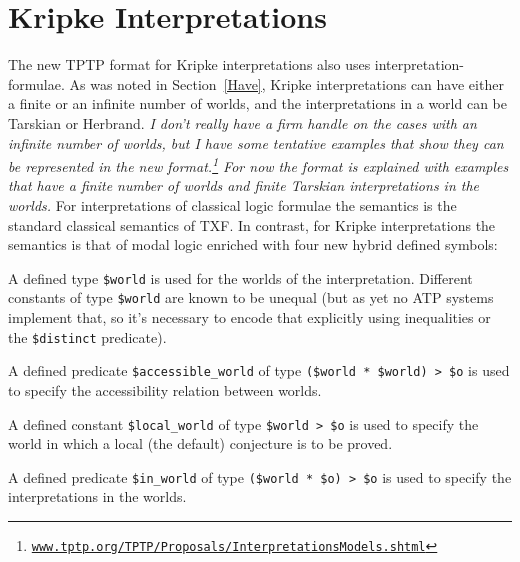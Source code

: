 \documentclass{easychair}
\newenvironment{packed_itemize}{
\vspace*{-0.3em}
\begin{itemize}
\setlength{\partopsep}{0pt}
\setlength{\itemsep}{1pt}
\setlength{\parskip}{0pt}
\setlength{\parsep}{0pt}
}{\end{itemize}}
\begin{document}
\section{Kripke Interpretations}
\label{NewKripke}
 
The new TPTP format for Kripke interpretations also uses interpretation-formulae.
As was noted in Section~\ref{Have}, Kripke interpretations can have either a finite or an
infinite number of worlds, and the interpretations in a world can be Tarskian or Herbrand.
\emph{I don't really have a firm handle on the cases with an infinite number of worlds, but I 
have some tentative examples that show they can be represented in the new format.\footnote{%
\href{https://www.tptp.org/TPTP/Proposals/InterpretationsModels.shtml\#KripkeInfiniteFinite}{{\tt www.tptp.org/TPTP/Proposals/InterpretationsModels.shtml}}}
For now the format is explained with examples that have a finite number of worlds and finite
Tarskian interpretations in the worlds.}
For interpretations of classical logic formulae the semantics is the standard classical semantics 
of TXF.
In contrast, for Kripke interpretations the semantics is that of modal logic enriched with four 
new hybrid defined symbols:
\begin{packed_itemize}
\item A defined type {\tt \$world} is used for the worlds of the interpretation.
      Different constants of type {\tt \$world} are known to be unequal (but as yet no ATP 
      systems implement that, so it's necessary to encode that explicitly using inequalities or 
      the {\tt \$distinct} predicate).
\item A defined predicate {\tt \$accessible\_world} of type {\tt (\$world\,*\,\$world)\,>\,\$o}
      is used to specify the accessibility relation between worlds.
\item A defined constant {\tt \$local\_world} of type {\tt \$world\,>\,\$o} is used to specify 
      the world in which a local (the default) conjecture is to be proved. 
\item A defined predicate {\tt \$in\_world} of type {\tt (\$world\,*\,\$o)\,>\,\$o} is used to 
      specify the interpretations in the worlds.
\end{packed_itemize}
\end{document}
